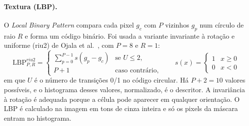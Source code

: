 \documentclass[11pt,a4paper]{article}
\begin{document}
\paragraph{Textura (LBP).} O \emph{Local Binary Pattern} compara cada pixel $g_c$ com $P$ vizinhos
$g_p$ num círculo de raio $R$ e forma um código binário. Foi usada a variante invariante à rotação e
uniforme (riu2) de Ojala et al.~\cite{ojala2002}, com $P=8$ e $R=1$:
\begin{equation}
  \mathrm{LBP}^{riu2}_{P,R} =
  \begin{cases}
    \sum_{p=0}^{P-1} s(g_p - g_c) & \text{se } U \le 2,\\
    P+1 & \text{caso contrário,}
  \end{cases}
  \qquad s(x)=\begin{cases}1 & x\ge 0\\ 0 & x<0\end{cases}
\end{equation}
em que $U$ é o número de transições 0/1 no código circular. Há $P+2=10$ valores possíveis, e o
histograma desses valores, normalizado, é o descritor. A invariância à rotação é adequada porque a
célula pode aparecer em qualquer orientação. O LBP é calculado na imagem em tons de cinza inteira e
só os pixels da máscara entram no histograma.
\end{document}
